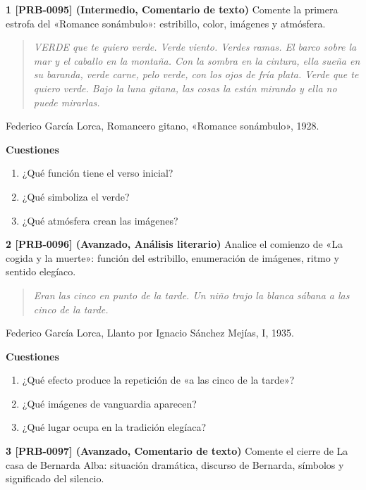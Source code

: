 \documentclass{book}
\begin{document}
\begin{tcolorbox}[title={Ejercicios}, studiumworked, breakable]

\noindent\textbf{1 [PRB-0095] (Intermedio, Comentario de texto)}
Comente la primera estrofa del «Romance sonámbulo»: estribillo, color, imágenes y atmósfera.


\begin{quote}
\itshape VERDE que te quiero verde. Verde viento. Verdes ramas. El barco sobre la mar y el caballo en la montaña. Con la sombra en la cintura, ella sueña en su baranda, verde carne, pelo verde, con los ojos de fría plata. Verde que te quiero verde. Bajo la luna gitana, las cosas la están mirando y ella no puede mirarlas.
\end{quote}
{\noindent\footnotesize Federico García Lorca, Romancero gitano, «Romance sonámbulo», 1928.\par}

\noindent\textbf{Cuestiones}
\begin{enumerate}
\item ¿Qué función tiene el verso inicial?
\item ¿Qué simboliza el verde?
\item ¿Qué atmósfera crean las imágenes?
\end{enumerate}

\noindent\textbf{2 [PRB-0096] (Avanzado, Análisis literario)}
Analice el comienzo de «La cogida y la muerte»: función del estribillo, enumeración de imágenes, ritmo y sentido elegíaco.


\begin{quote}
\itshape Eran las cinco en punto de la tarde. Un niño trajo la blanca sábana a las cinco de la tarde.
\end{quote}
{\noindent\footnotesize Federico García Lorca, Llanto por Ignacio Sánchez Mejías, I, 1935.\par}

\noindent\textbf{Cuestiones}
\begin{enumerate}
\item ¿Qué efecto produce la repetición de «a las cinco de la tarde»?
\item ¿Qué imágenes de vanguardia aparecen?
\item ¿Qué lugar ocupa en la tradición elegíaca?
\end{enumerate}

\noindent\textbf{3 [PRB-0097] (Avanzado, Comentario de texto)}
Comente el cierre de La casa de Bernarda Alba: situación dramática, discurso de Bernarda, símbolos y significado del silencio.



\end{tcolorbox}
\end{document}
